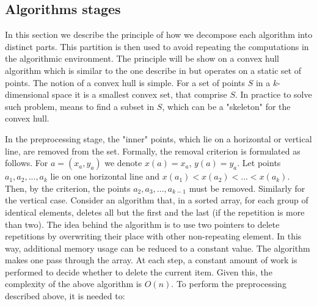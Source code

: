 \documentclass[twoside,twocolumn,10pt]{article}
\begin{document}
\subsection{Algorithms stages}


	In this section we describe the principle of how we decompose each algorithm into distinct parts. This partition is then used to avoid repeating the computations in the algorithmic environment. The principle will be show on a convex hull algorithm which is similar to the one describe in \cite{overmars} but operates on a static set of points.
	The notion of a convex hull is simple. For a set of points $S$ in a $k$-dimensional space it is a smallest convex set, that comprise $S$. In practice to solve such problem, means to find a subset in $S$, which can be a "skeleton" for the convex hull.


		In the preprocessing stage, the "inner" points, which lie on a horizontal or vertical line, are removed from the set. Formally, the removal criterion is formulated as follows. For $a = (x_a, y_a)$ we denote $x(a)=x_a$, $y(a)=y_a$. Let points $a_1, a_2, ..., a_k$ lie on one horizontal line and $x(a_1) < x(a_2) <... <x (a_k) $. Then, by the criterion, the points $a_2, a_3, ..., a_{k-1}$ must be removed. Similarly for the vertical case.
		Consider an algorithm that, in a sorted array, for each group of identical elements, deletes all but the first and the last (if the repetition is more than two). The idea behind the algorithm is to use two pointers to delete repetitions by overwriting their place with other non-repeating element. In this way, additional memory usage can be reduced to a constant value. The algorithm makes one pass through the array. At each step, a constant amount of work is performed to decide whether to delete the current item. Given this, the complexity of the above algorithm is $O(n)$.
		To perform the preprocessing described above, it is needed to:
\end{document}
